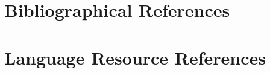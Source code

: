 \documentclass[10pt, a4paper]{article}
\begin{document}



\nocite{*}
\section{Bibliographical References}
\label{sec:reference}



\section{Language Resource References}
\label{lr:ref}
\end{document}
